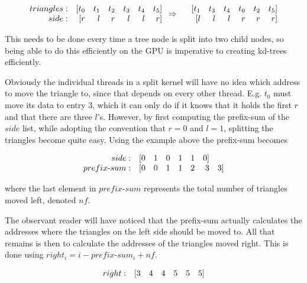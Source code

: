 \begin{displaymath}
  \begin{array} {r r r r r r r}
    triangles: & [t_0 & t_1 & t_2 & t_3 & t_4 & t_5]\\
    side: & [r & l & r & l & l & r]\\
  \end{array}
  \Rightarrow
  \begin{array} {r r r r r r r}
    &[t_1 & t_3 & t_4 & t_0 & t_2 & t_5]\\
    &[l & l & l & r & r & r]\\
  \end{array}
\end{displaymath}

This needs to be done every time a tree node is split into two child nodes, so
being able to do this efficiently on the GPU is imperative to creating kd-trees
efficiently.

Obviously the individual threads in a split kernel will have no idea which
address to move the triangle to, since that depends on every other
thread. E.g. $t_0$ must move its data to entry 3, which it can only do if it
knows that it holds the first $r$ and that there are three $l$'s. However, by
first computing the prefix-sum of the $side$ list, while adopting the convention
that $r = 0$ and $l = 1$, splitting the triangles become quite easy. Using the
example above the prefix-sum becomes

\begin{displaymath}
  \begin{array} {r r r r r r r r}
    side: & [0 & 1 & 0 & 1 & 1 & 0]\\
    prefix\text{-}sum: & [0 & 0 & 1 & 1 & 2 & 3 & 3]
  \end{array}
\end{displaymath}

where the last element in $prefix\text{-}sum$ represents the total number of
triangles moved left, denoted $nf$.

The observant reader will have noticed that the prefix-sum actually calculates
the addresses where the triangles on the left side should be moved to. All that
remains is then to calculate the addresses of the triangles moved right. This is
done using $right_i = i - prefix\text{-}sum_i + nf$.

\begin{displaymath}
  \begin{array} {r r r r r r r}
    right: & [3 & 4 & 4 & 5 & 5 & 5]
  \end{array}
\end{displaymath}

